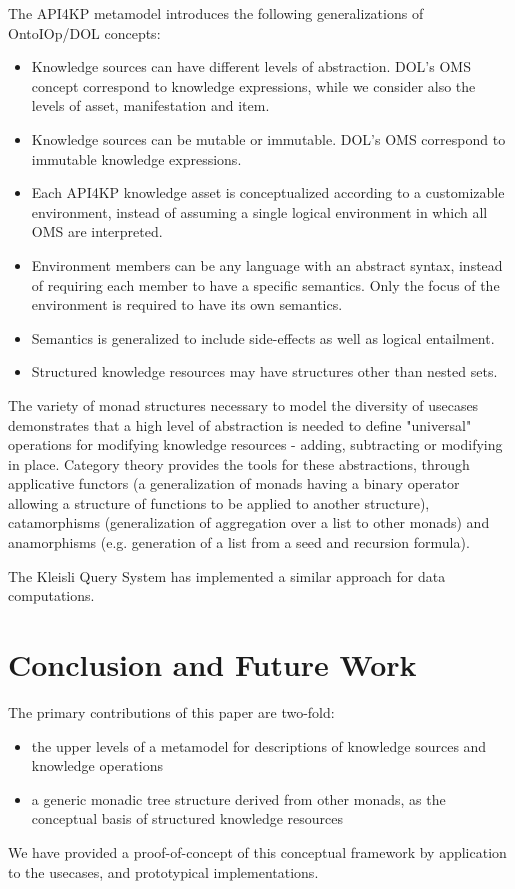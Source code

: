 \documentclass[runningheads]{llncs}
\begin{document}

The API4KP metamodel introduces the following generalizations of OntoIOp/DOL concepts:
\begin{itemize}
\item Knowledge sources can have different levels of abstraction. DOL's OMS concept correspond to knowledge expressions, while we consider also the levels of asset, manifestation and item.
\item Knowledge sources can be mutable or immutable. DOL's OMS correspond to immutable knowledge expressions.
\item Each API4KP knowledge asset is conceptualized according to a customizable environment, instead of assuming a single logical environment in which all OMS are interpreted.
\item Environment members can be any language with an abstract syntax, instead of requiring each member to have a specific semantics. Only the focus of the environment is required to have its own semantics.
\item Semantics is generalized to include side-effects as well as logical entailment.
\item Structured knowledge resources may have structures other than nested sets.
\end{itemize}

The variety of monad structures necessary to model the diversity of usecases demonstrates that a high level of abstraction is needed to define "universal" operations for modifying knowledge resources - adding, subtracting or modifying in place. Category theory provides the tools for these abstractions, through applicative functors (a generalization of monads having a binary operator allowing a structure of functions to be applied to another structure), catamorphisms (generalization of aggregation over a list to other monads) and anamorphisms (e.g. generation of a list from a seed and recursion formula).

The Kleisli Query System \cite{Wong2000} has implemented a similar approach for data computations.

\section{Conclusion and Future Work}
\label{conc}
The primary contributions of this paper are two-fold:
\begin{itemize}
\item the upper levels of a metamodel for descriptions of knowledge sources and knowledge operations
\item a generic monadic tree structure derived from other monads, as the conceptual basis of structured knowledge resources
\end{itemize}
We have provided a proof-of-concept of this conceptual framework by application to the usecases, and prototypical implementations.
\end{document}

